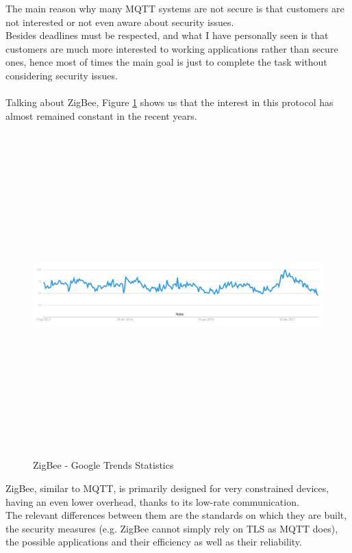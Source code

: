 \documentclass[12pt]{report}
\begin{document}
The main reason why many MQTT systems are not secure is that customers are not interested or not even aware about security issues.\\
Besides deadlines must be respected, and what I have personally seen is that customers are much more interested to working applications rather than secure ones, hence most of times the main goal is just to complete the task without considering security issues.\\\\

Talking about ZigBee, Figure \ref{fig:zigbee_googletrends} shows us that the interest in this protocol has almost remained constant in the recent years.

\begin{figure}[H]
\includegraphics[width=14cm,height=12.5cm,keepaspectratio]{zigbee_googletrends}
\centering
\caption{ZigBee - Google Trends Statistics}
\label{fig:zigbee_googletrends}
\end{figure}

ZigBee, similar to MQTT, is primarily designed for very constrained devices, having an even lower overhead, thanks to its low-rate communication.\\
The relevant differences between them are the standards on which they are built, the security measures (e.g. ZigBee cannot simply rely on TLS as MQTT does), the possible applications and their efficiency as well as their reliability.\\
\end{document}
